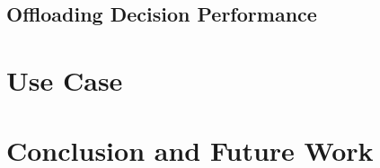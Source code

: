 \documentclass[10pt, conference, compsocconf]{IEEEtran}
\begin{document}
\subsection{Offloading Decision Performance}
%
\section{Use Case}
%
\section{Conclusion and Future Work}
% 
%
%
%

\end{document}
